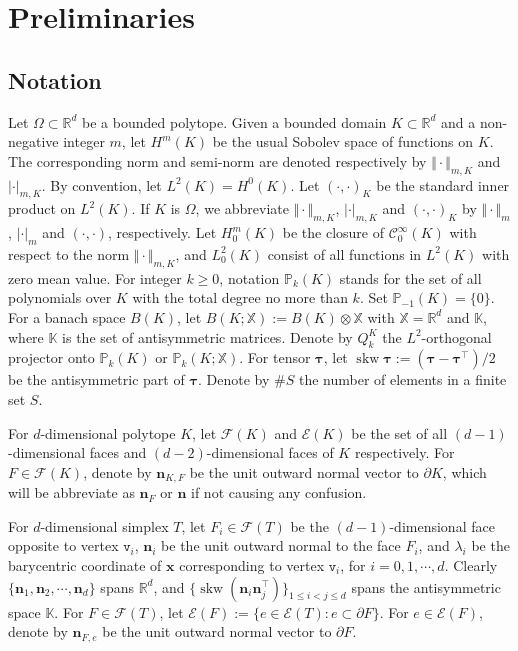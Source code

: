 \documentclass[10pt]{amsart}
\newcommand{\skw}{\operatorname{skw}}
\numberwithin{equation}{section}
\begin{document}
\section{Preliminaries}\label{sec:prelim}

\subsection{Notation}
Let $\Omega\subset \mathbb{R}^d$ be a bounded
polytope. Given a bounded domain $K\subset\mathbb{R}^{d}$ and a
non-negative integer $m$, let $H^m(K)$ be the usual Sobolev space of functions
on $K$.
The corresponding norm and semi-norm are denoted respectively by
$\Vert\cdot\Vert_{m,K}$ and $|\cdot|_{m,K}$. By convention, let $L^2(K)=H^0(K)$. 
Let $(\cdot, \cdot)_K$ be the standard inner product on $L^2(K)$. If $K$ is $\Omega$, we abbreviate
$\Vert\cdot\Vert_{m,K}$, $|\cdot|_{m,K}$ and $(\cdot, \cdot)_K$ by $\Vert\cdot\Vert_{m}$, $|\cdot|_{m}$ and $(\cdot, \cdot)$,
respectively. Let $H_0^m(K)$ be the closure of $\mathcal C_{0}^{\infty}(K)$ with
respect to the norm $\Vert\cdot\Vert_{m,K}$, and $L_0^2(K)$ consist of all functions in $L^2(K)$ with zero mean value.
For integer $k\geq0$,
notation $\mathbb P_k(K)$ stands for the set of all
polynomials over $K$ with the total degree no more than $k$. Set $\mathbb P_{-1}(K)=\{0\}$.
For a banach space $B(K)$, let $B(K; \mathbb{X}):=B(K)\otimes\mathbb{X}$ with $\mathbb{X}=\mathbb{R}^d$ and $\mathbb{K}$, where $\mathbb{K}$ is the set of antisymmetric matrices.
Denote by $Q_k^{K}$ the $L^2$-orthogonal projector onto $\mathbb P_k(K)$ or $\mathbb P_{k}(K; \mathbb{X})$.
For tensor $\boldsymbol{\tau}$, let $\skw\boldsymbol{\tau}:=(\boldsymbol{\tau}-\boldsymbol{\tau}^{\intercal})/2$ be the antisymmetric part of $\boldsymbol{\tau}$.
Denote by $\#S$ the number of elements in a finite set $S$.

For $d$-dimensional polytope $K$, let $\mathcal{F}(K)$ and $\mathcal{E}(K)$ be the set of all $(d-1)$-dimensional faces and $(d-2)$-dimensional faces of $K$ respectively. For $F\in\mathcal{F}(K)$, denote by $\boldsymbol{n}_{K,F}$ be the unit outward normal vector to $\partial K$, which will be abbreviate as $\boldsymbol{n}_F$ or $\boldsymbol{n}$ if not causing any confusion.

For $d$-dimensional simplex $T$,
let $F_i\in\mathcal F(T)$ be the $(d-1)$-dimensional face opposite to vertex $\texttt{v}_i$, $\boldsymbol n_i$ be the unit outward normal to the face $F_i$, and $\lambda_i$ be the barycentric coordinate of $\boldsymbol x$ corresponding to vertex $\texttt{v}_i$, for $i=0, 1, \cdots, d$.
Clearly $\{ \boldsymbol n_1, \boldsymbol n_2, \cdots, \boldsymbol n_d \}$ spans $\mathbb R^d$, and $\{\skw({\boldsymbol n_i\boldsymbol n_j^{\intercal}})\}_{1\leq i<j\leq d}$ spans the antisymmetric space $\mathbb K$. 
For $F\in\mathcal F(T)$, let $\mathcal{E}(F):=\{e\in\mathcal{E}(T): e\subset\partial F\}$.
For $e\in \mathcal E(F)$, denote by $\boldsymbol{n}_{F,e}$ be the unit outward normal vector to $\partial F$.
\end{document}
